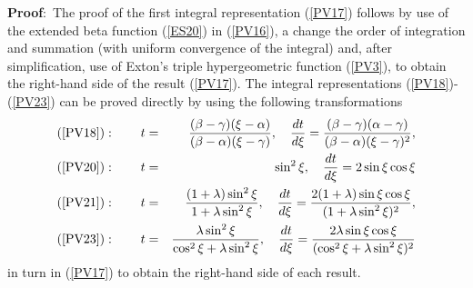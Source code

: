 \textbf{Proof}:\  The proof of the first integral representation (\ref{PV17}) follows by use of the extended beta function (\ref{ES20}) in (\ref{PV16}), a change the order of integration and summation (with uniform convergence of the integral) and, after simplification, use of Exton's triple hypergeometric function (\ref{PV3}), to obtain the right-hand side of the result (\ref{PV17}). The integral representations (\ref{PV18})-(\ref{PV23}) can be proved directly by using the following transformations
\begin{eqnarray*}
(\ref{PV18}):\qquad t&=&\frac{(\beta-\gamma)(\xi-\alpha)}{(\beta-\alpha)(\xi-\gamma)},\quad \frac{dt}{d\xi}=\frac{(\beta-\gamma)(\alpha-\gamma)}{(\beta-\alpha) (\xi-\gamma)^2},\\
(\ref{PV20}):\qquad t&=& \sin^2 \xi,\quad \frac{dt}{d\xi}=2\sin \xi \cos \xi\\
(\ref{PV21}):\qquad t&=&\frac{(1+\lambda)\sin^{2}\xi}{1+\lambda \sin^{2}\xi},\quad\frac{dt}{d\xi}=\frac{2(1+\lambda)\sin \xi \cos \xi}{(1+\lambda \sin^2 \xi)^2},\\
(\ref{PV23}):\qquad t&=&\frac{\lambda \sin^{2}\xi}{\cos^2{\xi}+\lambda \sin^{2}\xi},\quad \frac{dt}{d\xi}=\frac{2\lambda \sin \xi \cos \xi}{(\cos^2\xi+\lambda \sin^2\xi)^2}\\ 
\end{eqnarray*}
in turn in (\ref{PV17}) to obtain the right-hand side of each result.
\vspace{0.6cm}

